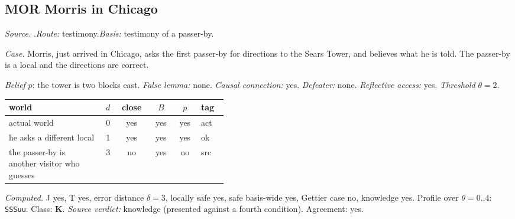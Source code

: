 \subsection*{MOR \enspace Morris in Chicago}
\noindent\textit{Source.} \citet{Lackey2007}.\quad \textit{Route:} testimony.\quad \textit{Basis:} testimony of a passer-by.\par
\noindent\textit{Case.} Morris, just arrived in Chicago, asks the first passer-by for directions to the Sears Tower, and believes what he is told. The passer-by is a local and the directions are correct.\par
\noindent\textit{Belief} $p$: the tower is two blocks east.
 \textit{False lemma:} none. \textit{Causal connection:} yes. \textit{Defeater:} none. \textit{Reflective access:} yes. \textit{Threshold} $\theta = 2$.\par
\begin{center}\begin{tabular}{@{}p{0.43\linewidth}rcccl@{}}
world & $d$ & close & $B$ & $p$ & tag \\ \midrule
actual world & 0 & yes & yes & yes & act \\
he asks a different local & 1 & yes & yes & yes & ok \\
the passer-by is another visitor who guesses & 3 & no & yes & no & src \\
\end{tabular}\end{center}
\noindent\textit{Computed.} J yes, T yes, error distance $\delta = 3$, locally safe yes, safe basis-wide yes, Gettier case no, knowledge yes. Profile over $\theta = 0..4$: \texttt{SSSuu}. Class: \textbf{K}.
 \textit{Source verdict:} knowledge (presented against a fourth condition). Agreement: yes.
\par\medskip
{}
